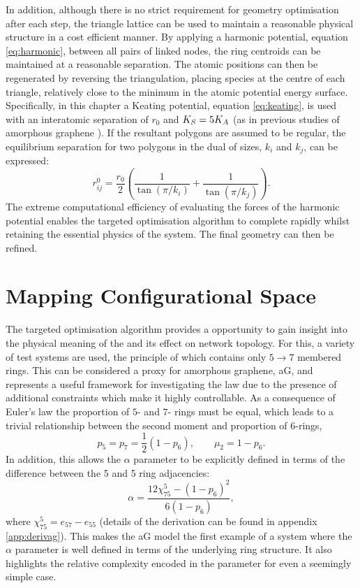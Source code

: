 In addition, although there is no strict requirement for geometry optimisation after each step, the triangle lattice can be used to maintain a reasonable physical structure in a cost efficient manner.
By applying a harmonic potential, equation \eqref{eq:harmonic}, between all pairs of linked nodes, the ring centroids can be maintained at a reasonable separation.
The atomic positions can then be regenerated by reversing the triangulation, placing species at the centre of each triangle, relatively close to the minimum in the atomic potential energy surface.
Specifically, in this chapter a Keating potential, equation \eqref{eq:keating}, is used  with an interatomic separation of $r_0$ and $K_S=5K_A$ (as in previous studies of amorphous graphene \cite{Kumar2012}).
If the resultant polygons are assumed to be regular, the equilibrium separation for two polygons in the dual of sizes, $k_i$ and $k_j$, can be expressed:
\begin{equation}
	r_{ij}^0 = \frac{r_0}{2}\left(\frac{1}{\tan\left(\pi/k_i\right)}+\frac{1}{\tan\left(\pi/k_j\right)}\right).
\end{equation}
The extreme computational efficiency of evaluating the forces of the harmonic potential enables the targeted optimisation algorithm to complete rapidly whilst retaining the essential physics of the system.
The final geometry can then be refined.

\section{Mapping Configurational Space}
\label{s:toptmapconfigspace}

The targeted optimisation algorithm provides a opportunity to gain insight into the physical meaning of the \aw{} and its effect on network topology.
For this, a variety of test systems are used, the principle of which contains only $5\rightarrow 7$ membered rings.
This can be considered a proxy for amorphous graphene, aG,
 and represents a useful framework for investigating the \aw{} law due to the presence of additional constraints which make it highly controllable. As a consequence of Euler's law the proportion of $5$\-- and $7$\-- rings must be equal, which leads to a trivial relationship between the second moment and proportion of $6$\--rings,
\begin{equation}
\label{eq:agcon}
        p_5=p_7=\frac{1}{2}\left(1-p_6\right), \qquad \mu_2=1-p_6.
\end{equation}
In addition, this allows the $\alpha$ parameter to be explicitly defined in terms of the difference between the 5 and 5 ring adjacencies:
\begin{equation}
	\label{eq:agalpha}
	\alpha = \frac{12\chi_{75}^5-\left(1-p_6\right)^2}{6\left(1-p_6\right)},
\end{equation}
where $\chi_{75}^5=e_{57}-e_{55}$ (details of the derivation can be found in appendix \ref{app:derivag}).
This makes the aG model the first example of a system where the $\alpha$ parameter is well defined in terms of the underlying ring structure.
It also highlights the relative complexity encoded in the \aw{} parameter for even a seemingly simple case.


